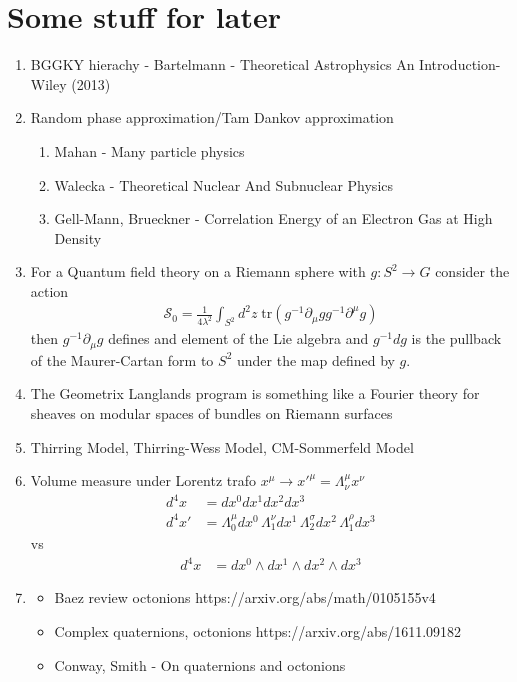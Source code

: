 \documentclass[10pt,a4paper]{book}
\theoremstyle{definition}
\begin{document}
\newpage 
\chapter{Some stuff for later}
\begin{enumerate}
\item BGGKY hierachy - Bartelmann - Theoretical Astrophysics An Introduction-Wiley (2013)
\item Random phase approximation/Tam Dankov approximation
\begin{enumerate}
\item Mahan - Many particle physics
\item Walecka - Theoretical Nuclear And Subnuclear Physics
\item Gell-Mann, Brueckner - Correlation Energy of an Electron Gas at High Density
\end{enumerate} 

\item For a Quantum field theory on a Riemann sphere with $g:S^2\rightarrow G$ consider the action 
    \begin{align}
        \mathcal{S}_0=\frac{1}{4\lambda^2}\int_{S^2}d^2z\;\text{tr}(g^{-1}\partial_\mu g g^{-1}\partial^\mu g)
    \end{align}
    then $g^{-1}\partial_\mu g$ defines and element of the Lie algebra and $g^{-1}dg$ is the pullback of the Maurer-Cartan form to $S^2$ under the map defined by $g$.

\item The Geometrix Langlands program is something like a Fourier theory for sheaves on modular spaces of bundles on Riemann surfaces  
    
\item Thirring Model, Thirring-Wess Model, CM-Sommerfeld Model
\item Volume measure under Lorentz trafo $x^\mu\rightarrow x'^\mu=\Lambda^\mu_\nu x^\nu$
    \begin{align}
        d^4x
        &=dx^0dx^1dx^2dx^3\\
        d^4x'&=\Lambda^\mu_0dx^0\,\Lambda^\nu_1dx^1\,\Lambda^\sigma_2dx^2\,\Lambda^\rho_1dx^3
    \end{align}
    vs
    \begin{align}
        d^4x
        &=dx^0\wedge dx^1\wedge dx^2\wedge dx^3
    \end{align}
\item 
    \begin{itemize}
        \item Baez review octonions {\sc https://arxiv.org/abs/math/0105155v4}
        \item Complex quaternions, octonions {\sc https://arxiv.org/abs/1611.09182}
        \item Conway, Smith - On quaternions and octonions
    \end{itemize}
\end{enumerate}
\end{document}
